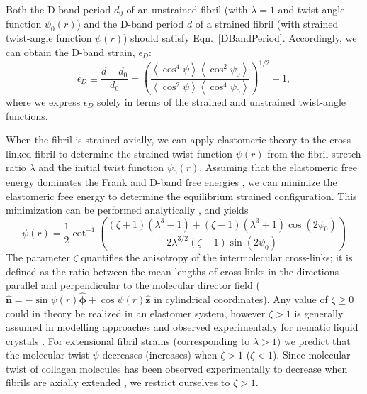 \documentclass[preprint,12pt]{elsarticle}
\begin{document}
Both the D-band period $d_0$ of an unstrained fibril (with $\lambda=1$ and twist angle function $\psi_0(r)$) and the D-band period $d$ of a strained fibril (with strained twist-angle function $\psi(r)$) should satisfy Eqn.~\ref{DBandPeriod}. Accordingly, we can obtain the D-band strain, $\epsilon_D$:
\begin{equation} \label{dbandstraineq}
\epsilon_D \equiv \frac{d-d_0}{d_0}  =\left( \frac{\left\langle \cos^4\psi\right\rangle\left\langle \cos^2\psi_0\right\rangle}{\left\langle \cos^2\psi\right\rangle\left\langle \cos^4\psi_0\right\rangle}\right)^{1/2}-1, 
\end{equation}
where we express $\epsilon_D$ solely in terms of the strained and unstrained twist-angle functions.

When the fibril is strained axially, we can apply elastomeric theory \cite{Warner:1996} to the cross-linked fibril to determine the strained twist function $\psi(r)$ from  the fibril stretch ratio $\lambda$ and the initial twist function $\psi_0(r)$. Assuming that the elastomeric free energy dominates the Frank and D-band free energies \cite{Leighton:2021}, we can minimize the elastomeric free energy to determine the equilibrium strained configuration. This minimization can be performed analytically \cite{Leighton:2021b}, and yields
\begin{equation}\label{psieq}
    \psi(r) = \frac{1}{2}\cot^{-1}\left( \frac{ (\zeta+1)(\lambda^3-1) + (\zeta-1)(\lambda^3+1)\cos(2\psi_0)}{2\lambda^{3/2}(\zeta-1)\sin(2\psi_0)} \right)
\end{equation}
The parameter $\zeta$ quantifies the anisotropy of the intermolecular cross-links; it is defined as the ratio between the mean lengths of cross-links in the directions parallel and perpendicular to the molecular director field ($\hat{\boldsymbol{n}} = -\sin\psi(r) \boldsymbol{\hat{\phi}} + \cos\psi(r) \boldsymbol{\hat{z}}$ in cylindrical coordinates). Any value of $\zeta\geq0$ could in theory be realized in an elastomer system, however $\zeta>1$ is generally assumed in modelling approaches \cite{Warner:1996,Warner:2000} and observed experimentally for nematic liquid crystals \cite{DAllest:1988,Kundler:1998}. For extensional fibril strains (corresponding to $\lambda>1$) we predict that the molecular twist $\psi$ decreases (increases) when $\zeta>1$ ($\zeta<1$). Since molecular twist of collagen molecules has been observed experimentally to decrease when fibrils are axially extended \cite{Bell:2018}, we restrict ourselves to $\zeta>1$.
\end{document}
